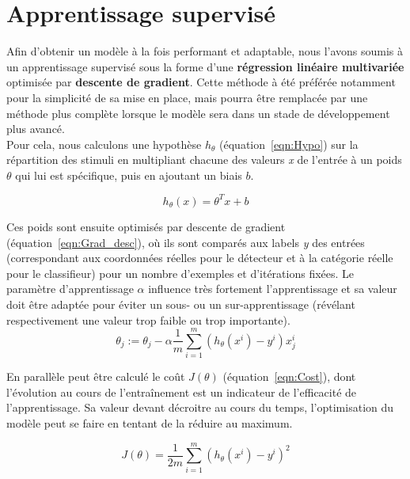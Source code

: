
\section{Apprentissage supervisé} %

Afin d'obtenir un modèle à la fois performant et adaptable, nous l'avons soumis à un apprentissage supervisé sous la forme d'une \textbf{régression linéaire multivariée} optimisée par \textbf{descente de gradient}. Cette méthode à été préférée notamment pour la simplicité de sa mise en place, mais pourra être remplacée par une méthode plus complète lorsque le modèle sera dans un stade de développement plus avancé.\\
Pour cela, nous calculons une hypothèse $h_{\theta}$ (équation~\ref{eqn:Hypo}) sur la répartition des stimuli en multipliant chacune des valeurs \textit{x} de l'entrée à un poids $\theta$ qui lui est spécifique, puis en ajoutant un biais $b$.

\begin{equation}
h_{\theta}(x) = \theta^{T}x + b
\label{eqn:Hypo}
\end{equation}

Ces poids sont ensuite optimisés par descente de gradient (équation~\ref{eqn:Grad_desc}), où ils sont comparés aux labels \textit{y} des entrées (correspondant aux coordonnées réelles pour le détecteur et à la catégorie réelle pour le classifieur) pour un nombre d'exemples et d'itérations fixées. Le paramètre d'apprentissage $\alpha$ influence très fortement l'apprentissage et sa valeur doit être adaptée pour éviter un sous- ou un sur-apprentissage (révélant respectivement une valeur trop faible ou trop importante).\\

\begin{equation}
\theta_j := \theta_j - \alpha \frac{1}{m} \sum_{i=1}^m (h_\theta(x^i) - y^i)x_{j}^i
\label{eqn:Grad_desc}
\end{equation}

En parallèle peut être calculé le coût $J(\theta)$ (équation~\ref{eqn:Cost}), dont l'évolution au cours de l'entraînement est un indicateur de l'efficacité de l'apprentissage. Sa valeur devant décroitre au cours du temps, l'optimisation du modèle peut se faire en tentant de la réduire au maximum.

\begin{equation}
J(\theta) = \frac{1}{2m} \sum_{i=1}^m (h_\theta(x^i)-y^i)^2
\label{eqn:Cost}
\end{equation}